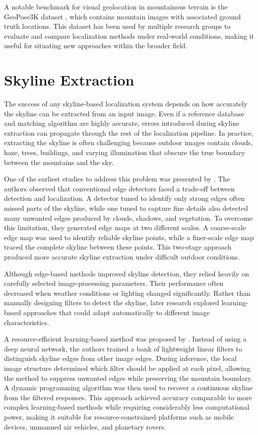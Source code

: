 A notable benchmark for visual geolocation in mountainous terrain is the GeoPose3K dataset \cite{brejcha2017geopose3k}, which contains mountain images with associated ground truth locations. This dataset has been used by multiple research groups to evaluate and compare localization methods under real-world conditions, making it useful for situating new approaches within the broader field.

\section{Skyline Extraction}

The success of any skyline-based localization system depends on how accurately the skyline can be extracted from an input image. Even if a reference database and matching algorithm are highly accurate, errors introduced during skyline extraction can propagate through the rest of the localization pipeline. In practice, extracting the skyline is often challenging because outdoor images contain clouds, haze, trees, buildings, and varying illumination that obscure the true boundary between the mountains and the sky.

One of the earliest studies to address this problem was presented by \cite{woo2007robust}. The authors observed that conventional edge detectors faced a trade-off between detection and localization. A detector tuned to identify only strong edges often missed parts of the skyline, while one tuned to capture fine details also detected many unwanted edges produced by clouds, shadows, and vegetation. To overcome this limitation, they generated edge maps at two different scales. A coarse-scale edge map was used to identify reliable skyline points, while a finer-scale edge map traced the complete skyline between these points. This two-stage approach produced more accurate skyline extraction under difficult outdoor conditions.

Although edge-based methods improved skyline detection, they relied heavily on carefully selected image-processing parameters. Their performance often decreased when weather conditions or lighting changed significantly. Rather than manually designing filters to detect the skyline, later research explored learning-based approaches that could adapt automatically to different image characteristics.

A resource-efficient learning-based method was proposed by \cite{ahmad2021resource}. Instead of using a deep neural network, the authors trained a bank of lightweight linear filters to distinguish skyline edges from other image edges. During inference, the local image structure determined which filter should be applied at each pixel, allowing the method to suppress unwanted edges while preserving the mountain boundary. A dynamic programming algorithm was then used to recover a continuous skyline from the filtered responses. This approach achieved accuracy comparable to more complex learning-based methods while requiring considerably less computational power, making it suitable for resource-constrained platforms such as mobile devices, unmanned air vehicles, and planetary rovers.

